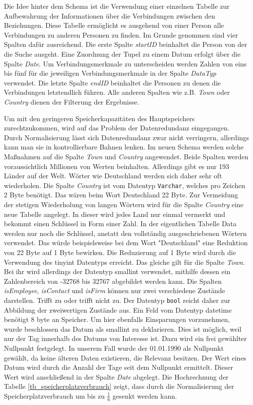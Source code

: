 Die Idee hinter dem Schema ist die Verwendung einer einzelnen Tabelle zur Aufbewahrung der Informationen über die Verbindungen zwischen den Beziehungen. Diese Tabelle ermöglicht es ausgehend von einer Person alle Verbindungen zu anderen Personen zu finden. Im Grunde genommen sind vier Spalten dafür ausreichend. Die erste Spalte \textit{startID} beinhaltet die Person von der die Suche ausgeht. Eine Zuordnung der Tupel zu einem Datum erfolgt über die Spalte \textit{Date}. Um Verbindungsmerkmale zu unterscheiden werden Zahlen von eins bis fünf für die jeweiligen Verbindungsmerkmale in der Spalte \textit{DataTyp} verwendet. Die letzte Spalte \textit{endID} beinhaltet die Personen zu denen die Verbindungen letztendlich führen. Alle anderen Spalten wie z.B. \textit{Town} oder \textit{Country} dienen der Filterung der Ergebnisse.

Um mit den geringeren Speicherkapazitäten des Hauptspeichers zurechtzukommen, wird auf das Problem der Datenredundanz eingegangen. Durch Normalisierung lässt sich Datenredundanz zwar nicht verringern, allerdings kann man sie in kontrollierbare Bahnen lenken. Im neuen Schema werden solche Maßnahmen auf die Spalte \textit{Town} und \textit{Country} angewendet. Beide Spalten werden voraussichtlich Millionen von Werten beinhalten. Allerdings gibt es nur 193 Länder auf der Welt. Wörter wie Deutschland werden sich daher sehr oft wiederholen. Die Spalte \textit{Country} ist vom Datentyp \texttt{Varchar}, welches pro Zeichen 2 Byte benötigt. Das wären beim Wort Deutschland 22 Byte. Zur Vermeidung der stetigen Wiederholung von langen Wörtern wird für die Spalte \textit{Country} eine neue Tabelle angelegt. In dieser wird jedes Land nur einmal vermerkt und bekommt einen Schlüssel in Form einer Zahl. In der eigentlichen Tabelle Data werden nur noch die Schlüssel, anstatt den vollständig ausgeschriebenen Wörtern verwendet. Das würde beispielsweise bei dem Wort "Deutschland" eine Reduktion von 22 Byte auf 1 Byte bewirken. Die Reduzierung auf 1 Byte wird durch die Verwendung des tinyint Datentyps erreicht. Das gleiche gilt für die Spalte \textit{Town}. Bei ihr wird allerdings der Datentyp smallint verwendet, mithilfe dessen ein Zahlenbereich von -32768 bis 32767 abgebildet werden kann. Die Spalten \textit{isEmployee}, \textit{isContact} und \textit{isFirm} können nur zwei verschiedene Zustände darstellen. Trifft zu oder trifft nicht zu. Der Datentyp \texttt{bool} reicht daher zur Abbildung der zweiwertigen Zustände aus. Ein Feld vom Datentyp datetime benötigt 8 byte an Speicher. Um hier ebenfalls Einsparungen vorzunehmen, wurde beschlossen das Datum als smallint zu deklarieren. Dies ist möglich, weil nur der Tag innerhalb des Datums von Interesse ist. Dazu wird ein frei gewählter Nullpunkt festgelegt. In unserem Fall wurde der 01.01.1990 als Nullpunkt gewählt, da keine älteren Daten existieren, die Relevanz besitzen. Der Wert eines Datum wird durch die Anzahl der Tage seit dem Nullpunkt ermittelt. Dieser Wert wird anschließend in der Spalte \textit{Date} abgelegt. Die Hochrechnung der Tabelle \ref{tb_speicherplatzverbrauch} zeigt, dass durch die Normalisierung der Speicherplatzverbrauch um bis zu $ \frac{1}{6} $ gesenkt werden kann.

